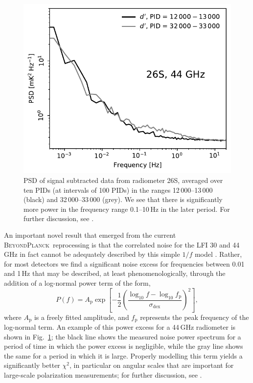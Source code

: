 \documentclass[twocolumn]{aa}
\newcommand{\BP}{\textsc{BeyondPlanck}}
\begin{document}
\begin{figure}
        \begin{center}
                \includegraphics[width=\linewidth]{figs/ps_running_mean_26S.pdf}
        \end{center}
        \caption{PSD of signal subtracted data from radiometer 26S, averaged over ten PIDs (at intervals of 100 PIDs) in the ranges 
    12\,000--13\,000 (black) and 32\,000--33\,000 (grey). We see that there is
    significantly more power in the frequency range 0.1--10\,Hz in the
    later period. For further discussion, see \citet{bp06}.
                \label{fig:ps_compare_26S}}
\end{figure}

An important novel result that emerged from the current
\BP\ reprocessing is that the correlated noise for the LFI 30 and
44\,GHz in fact cannot be adequately described by this simple $1/f$
model \citep{bp06}. Rather, for most detectors we find a significant
noise excess for frequencies between 0.01 and 1\,Hz that may
be described, at least phenomenologically, through the addition of a
log-normal power term of the form,
\begin{equation}
  P(f) = A_\mathrm{p}
    \exp\left[-\frac{1}{2}\left(\frac{\log_{10}f - \log_{10} f_\mathrm{p}}{\sigma_\mathrm{dex}}\right)^2\right],
    \label{eq:1fmodel_lognorm}
\end{equation} 
where $A_{\mathrm{p}}$ is a freely fitted amplitude, and
$f_\mathrm{p}$ represents the peak frequency of the log-normal
term. An example of this power excess for a 44\,GHz radiometer is
shown in Fig.~\ref{fig:ps_compare_26S}; the black line shows the
measured noise power spectrum for a period of time in which the power
excess is negligible, while the gray line shows the same for a period
in which it is large. Properly modelling this term yields a
significantly better $\chi^2$, in particular on angular scales that
are important for large-scale polarization measurements; for further
discussion, see \citet{bp06}.
\end{document}
